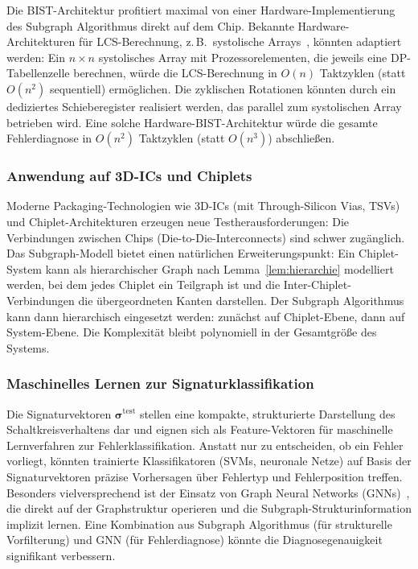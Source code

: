 ﻿\documentclass[a4paper,12pt]{article}
\theoremstyle{definition}
\begin{document}
Die BIST-Architektur profitiert maximal von einer
Hardware-Implementierung des Subgraph Algorithmus direkt auf dem
Chip. Bekannte Hardware-Architekturen für LCS-Berechnung, z.\,B.\
systolische Arrays~\cite{kung1979systolic}, könnten adaptiert werden:
Ein $n \times n$ systolisches Array mit Prozessorelementen, die
jeweils eine DP-Tabellenzelle berechnen, würde die LCS-Berechnung
in $O(n)$ Taktzyklen (statt $O(n^2)$ sequentiell) ermöglichen.
Die zyklischen Rotationen könnten durch ein dediziertes Schieberegister
realisiert werden, das parallel zum systolischen Array betrieben wird.
Eine solche Hardware-BIST-Architektur würde die gesamte Fehlerdiagnose
in $O(n^2)$ Taktzyklen (statt $O(n^3)$) abschließen.

\subsubsection{Anwendung auf 3D-ICs und Chiplets}

Moderne Packaging-Technologien wie 3D-ICs (mit Through-Silicon Vias,
TSVs) und Chiplet-Architekturen erzeugen neue Testherausforderungen:
Die Verbindungen zwischen Chips (Die-to-Die-Interconnects) sind
schwer zugänglich. Das Subgraph-Modell bietet einen natürlichen
Erweiterungspunkt: Ein Chiplet-System kann als hierarchischer Graph
nach Lemma~\ref{lem:hierarchie} modelliert werden, bei dem jedes
Chiplet ein Teilgraph ist und die Inter-Chiplet-Verbindungen die
übergeordneten Kanten darstellen. Der Subgraph Algorithmus kann dann
hierarchisch eingesetzt werden: zunächst auf Chiplet-Ebene, dann
auf System-Ebene. Die Komplexität bleibt polynomiell in der
Gesamtgröße des Systems.

\subsubsection{Maschinelles Lernen zur Signaturklassifikation}

Die Signaturvektoren $\boldsymbol{\sigma}^{\mathrm{test}}$ stellen
eine kompakte, strukturierte Darstellung des Schaltkreisverhaltens
dar und eignen sich als Feature-Vektoren für maschinelle
Lernverfahren zur Fehlerklassifikation. Anstatt nur zu entscheiden,
ob ein Fehler vorliegt, könnten trainierte Klassifikatoren (SVMs,
neuronale Netze) auf Basis der Signaturvektoren präzise Vorhersagen
über Fehlertyp und Fehlerposition treffen. Besonders vielversprechend
ist der Einsatz von Graph Neural
Networks (GNNs)~\cite{kipf2017semi}, die direkt auf der Graphstruktur
operieren und die Subgraph-Strukturinformation implizit lernen.
Eine Kombination aus Subgraph Algorithmus (für strukturelle
Vorfilterung) und GNN (für Fehlerdiagnose) könnte die
Diagnosegenauigkeit signifikant verbessern.
\end{document}
